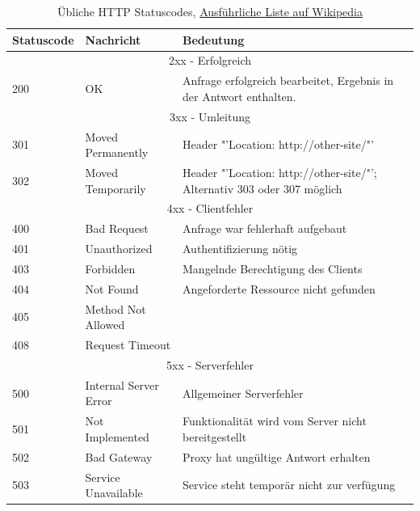 \begin{table}[H]
	\begin{tabularx}{\textwidth}{l|p{100pt}|X}
		\textbf{Statuscode} & \textbf{Nachricht} & \textbf{Bedeutung}\\ \hline
		\multicolumn{3}{c}{2xx - Erfolgreich} \\ \hline
		200 & OK & Anfrage erfolgreich bearbeitet, Ergebnis in der Antwort enthalten. \\ \hline
		\multicolumn{3}{c}{3xx - Umleitung} \\ \hline
		301 & Moved Permanently & Header "'Location: http://other-site/"' \\ \hline
		302 & Moved Temporarily & Header "'Location: http://other-site/"'; Alternativ 303 oder 307 möglich \\ \hline
		\multicolumn{3}{c}{4xx - Clientfehler} \\ \hline
		400 & Bad Request & Anfrage war fehlerhaft aufgebaut \\ \hline
		401 & Unauthorized & Authentifizierung nötig \\ \hline
		403 & Forbidden & Mangelnde Berechtigung des Clients \\ \hline
		404 & Not Found & Angeforderte Ressource nicht gefunden \\ \hline
		405 & Method Not Allowed & \\ \hline
		408 & Request Timeout & \\ \hline
		\multicolumn{3}{c}{5xx - Serverfehler} \\ \hline
		500 & Internal Server Error & Allgemeiner Serverfehler \\ \hline
		501 & Not Implemented & Funktionalität wird vom Server nicht bereitgestellt \\ \hline
		502 & Bad Gateway & Proxy hat ungültige Antwort erhalten \\ \hline
		503 & Service Unavailable & Service steht temporär nicht zur verfügung \\ \hline
	\end{tabularx}
	\caption{Übliche HTTP Statuscodes,   \href{https://de.wikipedia.org/wiki/HTTP-Statuscode}{Ausführliche Liste auf Wikipedia}}
\end{table}


